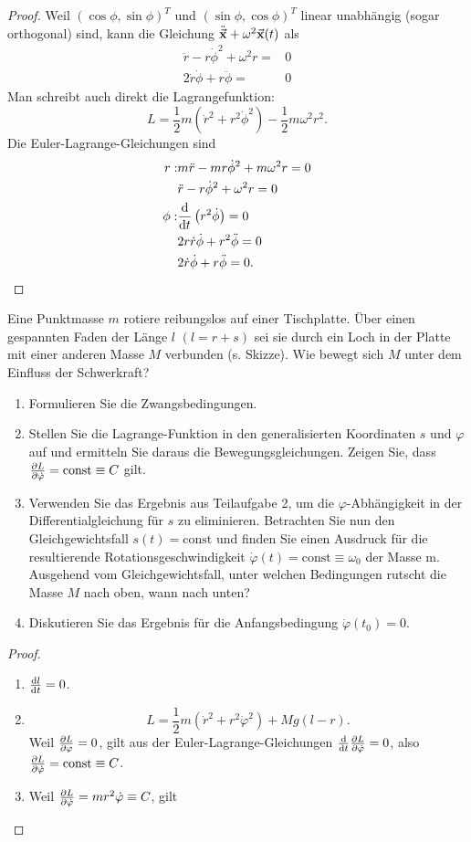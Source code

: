 \begin{proof}
	Weil $(\cos\phi, \sin\phi)^T$ und $(\sin\phi, \cos\phi)^T$ linear unabhängig (sogar orthogonal) sind, kann die Gleichung $\ddot{\va x}+\omega^2\va x(t)$ als
	\begin{align*}
		\ddot{r}-r\dot{\phi}^2+\omega^2 r=&0\\
		2\dot{r}\dot{\phi}+r\ddot{\phi}=&0
	\end{align*}
	Man schreibt auch direkt die Lagrangefunktion:
	\[
		L=\frac{1}{2}m\left( \dot{r}^2+r^2\dot{\phi}^2 \right)-\frac{1}{2}m\omega^2r^2 
	.\] 
	Die Euler-Lagrange-Gleichungen sind
	\begin{align*}
		r:& m\ddot{r}-mr\dot{\phi}^2+m\omega^2r=0\\
		  & \ddot{r}-r\dot{\phi}^2+\omega^2 r=0\\
		\phi:& \dv{t}\left( r^2\dot{\phi} \right) =0\\
		     & 2r\dot{r}\dot{\phi}+r^2\ddot{\phi}=0\\
		     & 2\dot{r}\dot{\phi}+r\ddot{\phi}=0.\qedhere
	\end{align*}
\end{proof}
\begin{Problem}
	Eine Punktmasse $m$ rotiere reibungslos auf einer Tischplatte. Über einen gespannten Faden der Länge $l$ $(l = r + s)$ sei sie durch ein Loch in der Platte mit einer anderen Masse $M$ verbunden (s. Skizze). Wie bewegt sich $M$ unter dem Einfluss der Schwerkraft?
	\begin{enumerate}
		\item Formulieren Sie die Zwangsbedingungen.
		\item Stellen Sie die Lagrange-Funktion in den generalisierten Koordinaten $s$ und $\varphi$ auf und ermitteln Sie daraus die Bewegungsgleichungen. Zeigen Sie, dass $\pdv{L}{\dot{\varphi}}  = \text{const} \equiv C$ gilt.
		\item Verwenden Sie das Ergebnis aus Teilaufgabe 2, um die $\varphi$-Abhängigkeit in der Differentialgleichung für $s$ zu eliminieren. Betrachten Sie nun den Gleichgewichtsfall $s(t) = \text{const}$ und finden Sie einen Ausdruck für die resultierende Rotationsgeschwindigkeit $\dot{\varphi}(t) = \text{const} \equiv \omega_0$ der Masse m. Ausgehend vom Gleichgewichtsfall, unter welchen Bedingungen rutscht die Masse $M$ nach oben, wann nach unten?
		\item Diskutieren Sie das Ergebnis für die Anfangsbedingung $\dot{\varphi}(t_0) = 0$.
	\end{enumerate}
\end{Problem}
\begin{proof}
	\begin{enumerate}
		\item $\dv{l}{t}=0$.
		\item \[
				L=\frac{1}{2}m\left( \dot{r}^2+r^2\dot{\varphi}^2 \right) +Mg(l-r)
		.\] 
		Weil $\pdv{L}{\varphi}=0$, gilt aus der Euler-Lagrange-Gleichungen $\dv{t}\pdv{L}{\dot{\varphi}}=0$, also $\pdv{L}{\dot{\varphi}}=\text{const}\equiv C$.
	\item Weil $\pdv{L}{\dot{\varphi}}=mr^2\dot{\varphi}\equiv C$, gilt
	\end{enumerate}
\end{proof}
